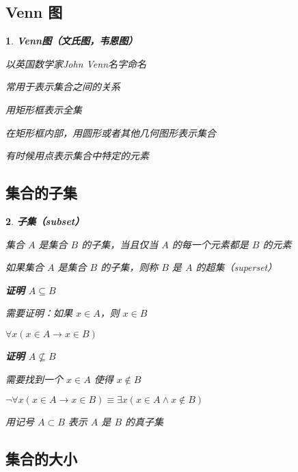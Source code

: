 \documentclass[UTF8]{report}
\theoremstyle{MyLineTheoremStyle} %
\theoremstyle{MyBlockTheoremStyle} %
\theoremstyle{MySubsubsectionStyle} %
\newtheorem{definition}{}
\begin{document}
\subsection{Venn 图}

\begin{definition}
    \textbf{Venn图（文氏图，韦恩图）}\par
    以英国数学家John Venn名字命名\par
    常用于表示集合之间的关系\par
    用矩形框表示全集\par
    在矩形框内部，用圆形或者其他几何图形表示集合\par
    有时候用点表示集合中特定的元素\par
\end{definition}

\subsection{集合的子集}

\begin{definition}
    \textbf{子集（subset）}\par
    集合 $A$ 是集合 $B$ 的子集，当且仅当 $A$ 的每一个元素都是 $B$ 的元素\par
    如果集合 $A$ 是集合 $B$ 的子集，则称 $B$ 是 $A$ 的超集（superset）\par

    \textbf{证明 $A \subseteq B$}\par
    需要证明：如果 $x \in A$，则 $x \in B$\par
    $\forall x (x \in A \rightarrow x \in B)$\par

    \textbf{证明 $A \nsubseteq B$}\par
    需要找到一个 $x \in A$ 使得 $x \notin B$\par
    $\neg \forall x (x \in A \rightarrow x \in B) \equiv \exists x (x \in A \land x \notin B)$\par

    用记号 $A \subset B$ 表示 $A$ 是 $B$ 的真子集\par
\end{definition}

\subsection{集合的大小}
\end{document}
